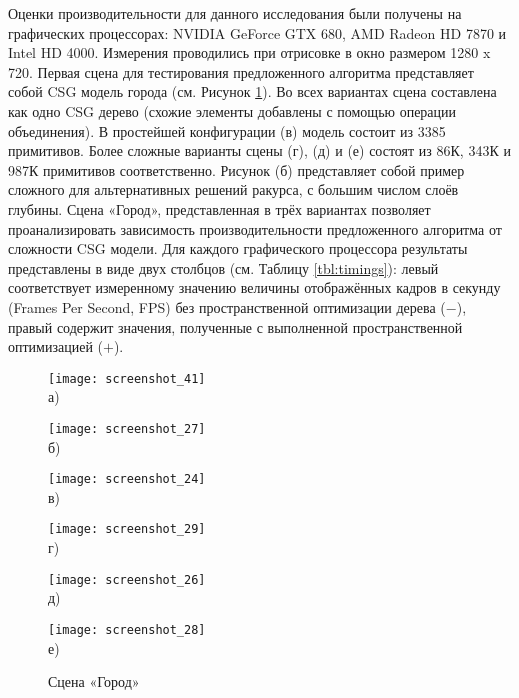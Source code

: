 Оценки производительности для данного исследования были получены на графических процессорах: NVIDIA GeForce GTX 680, AMD Radeon HD 7870 и Intel HD 4000. Измерения проводились при отрисовке в окно размером 1280 x 720. Первая сцена для тестирования предложенного алгоритма представляет собой CSG модель города (см. Рисунок \ref{fig:results_city}). Во всех вариантах сцена составлена как одно CSG дерево (схожие элементы добавлены с помощью операции объединения). В простейшей конфигурации (в) модель состоит из 3385 примитивов. Более сложные варианты сцены (г), (д) и (е) состоят из 86К, 343К и 987К примитивов соответственно. Рисунок (б) представляет собой пример сложного для альтернативных решений ракурса, с большим числом слоёв глубины. Сцена «Город», представленная в трёх вариантах позволяет проанализировать зависимость производительности предложенного алгоритма от сложности CSG модели. Для каждого графического процессора результаты представлены в виде двух столбцов (см. Таблицу \ref{tbl:timings}): левый соответствует измеренному значению величины отображённых кадров в секунду (Frames Per Second, FPS) без пространственной оптимизации дерева ($-$), правый содержит значения, полученные с выполненной пространственной оптимизацией ($+$).

\begin{figure}[ht]
  \begin{minipage}[ht]{0.49\linewidth}\centering
    \texttt{[image: screenshot\_41]} \\ а)
  \end{minipage}
  \hfill
  \begin{minipage}[ht]{0.49\linewidth}\centering
    \texttt{[image: screenshot\_27]} \\ б)
  \end{minipage}

  \begin{minipage}[ht]{0.49\linewidth}\centering
    \texttt{[image: screenshot\_24]} \\ в)
  \end{minipage}
  \hfill
  \begin{minipage}[ht]{0.49\linewidth}\centering
    \texttt{[image: screenshot\_29]} \\ г)
  \end{minipage}

  \begin{minipage}[ht]{0.49\linewidth}\centering
    \texttt{[image: screenshot\_26]} \\ д)
  \end{minipage}
  \hfill
  \begin{minipage}[ht]{0.49\linewidth}\centering
    \texttt{[image: screenshot\_28]} \\ е)
  \end{minipage}
  \caption{Сцена «Город»}
  \label{fig:results_city}  
\end{figure}


